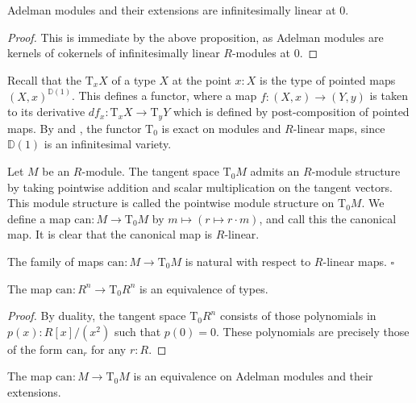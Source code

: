 \begin{corollary}
  Adelman modules and their extensions are infinitesimally linear at $0$.
\end{corollary}

\begin{proof}
  This is immediate by the above proposition, as Adelman modules are kernels of cokernels of infinitesimally linear $R$-modules at $0$.
\end{proof}

Recall that the  $\mathrm{T}_x X$ of a type $X$ at the point $x : X$ is the type of pointed maps $(X,x)^{\mathbb{D}(1)}$.
This defines a functor, where a map $f : (X, x) \rightarrow (Y, y)$ is taken to its derivative $df_x : \mathrm{T}_xX \rightarrow \mathrm{T}_y Y$ which is defined by post-composition of pointed maps.
By  and ,
the functor $\mathrm{T}_0$ is exact on modules and $R$-linear maps, since $\mathbb{D}(1)$ is an infinitesimal variety.

Let $M$ be an $R$-module.
The tangent space $\mathrm{T}_0M$ admits an $R$-module structure by taking pointwise addition and scalar multiplication on the tangent vectors.
This module structure is called the pointwise module structure on $\mathrm{T}_0M$.
We define a map $\mathrm{can} : M \rightarrow \mathrm{T}_0M$ by $m \mapsto (r \mapsto r \cdot m)$, and call this the canonical map.
It is clear that the canonical map is $R$-linear.

\begin{proposition}
  The family of maps $\mathrm{can} : M \rightarrow \mathrm{T}_0M$ is natural with respect to $R$-linear maps. \hfill$\square$
\end{proposition}

\begin{proposition}
  The map $\mathrm{can} : R^n \rightarrow \mathrm{T}_0R^n$ is an equivalence of types.
\end{proposition}

\begin{proof}
  By duality, the tangent space $\mathrm{T}_0R^n$ consists of those polynomials in $p(x) : R[x]/(x^2)$ such that $p(0)=0$.
  These polynomials are precisely those of the form $\mathrm{can}_r$ for any $r : R$.
\end{proof}

\begin{corollary}\label{can-equiv}
    The map $\mathrm{can} : M \rightarrow \mathrm{T}_0M$ is an equivalence on Adelman modules and their extensions.
\end{corollary}

